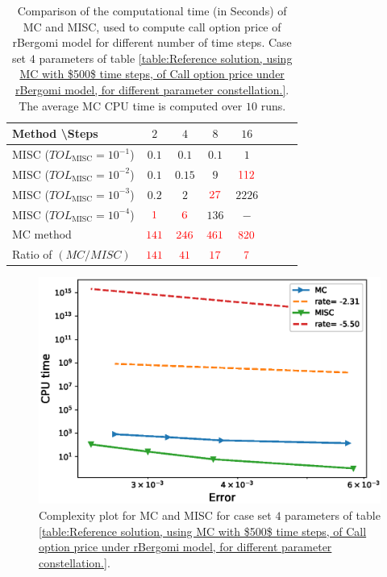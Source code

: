 \FloatBarrier
\begin{table}[h!]
	\centering
	\begin{tabular}{l*{6}{c}r}
		Method \textbackslash  Steps            & $2$ & $4$ & $8$ & $16$ &   \\
		\hline
		MISC ($TOL_{\text{MISC}}=10^{-1}$)  & $0.1$ & $0.1$ & $0.1$ & $1$ \\
		MISC ($TOL_{\text{MISC}}=10^{-2}$)  & $0.1$ & $0.15$ & $9$ & $\red{112}$ \\
		MISC ($TOL_{\text{MISC}}=10^{-3}$)  & $0.2$ & $2$ & $\red{27}$ & $2226$ \\
		MISC ($TOL_{\text{MISC}}=10^{-4}$)  & $\red{1}$ & $\red{6}$ & $136$ & $-$\\
		\hline
		MC method   & $ \red{141}
		
		$  & $  \red{246}$  & $  \red{461}$ & $ \red{820}
		$  \\	
		\hline
		Ratio of $\left(MC/MISC \right)$ & $ \red{141}
		
		$  & $  \red{
			41
		}$  & $  \red{    17
		}$ & $ \red{ 7}
		$  \\	
%		
		\hline
	\end{tabular}
	\caption{Comparison of the computational time (in Seconds) of  MC and MISC, used to compute call option price of rBergomi model for different number of time steps. Case set $4$ parameters of table \ref{table:Reference solution, using MC with $500$ time steps, of Call option price under rBergomi model, for different parameter constellation.}. The average  MC CPU time is computed over $10$ runs. }
	\label{Comparsion of the computational time of  MC and MISC, used to compute Call option price of rBergomi model for different number of time steps. Case set4}
\end{table}


\FloatBarrier

	\begin{figure}[h!]
	\centering
	\includegraphics[width=0.4\linewidth]{./figures/rBergomi_Complexity_rates/set6/error_vs_time_set6}
	
	\caption{Complexity plot for   MC and MISC for case set $4$ parameters of table \ref{table:Reference solution, using MC with $500$ time steps, of Call option price under rBergomi model, for different parameter constellation.}.}
	\label{fig:Complexity plot for MC and MISC for case set $4$ parameters}
\end{figure}
\FloatBarrier
